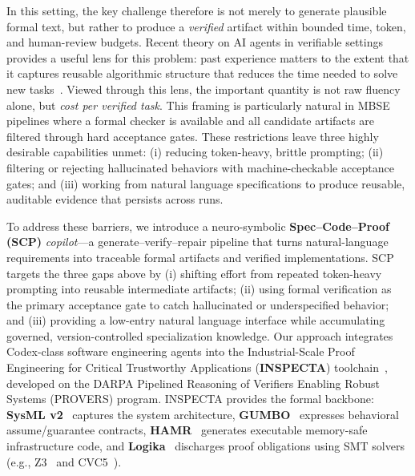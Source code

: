 \documentclass[conference]{IEEEtran}
\begin{document}
In this setting, the key challenge therefore is not merely to generate plausible formal text, but rather to produce a \emph{verified} artifact within bounded time, token, and human-review budgets. Recent theory on AI agents in verifiable settings provides a useful lens for this problem: past experience matters to the extent that it captures reusable algorithmic structure that reduces the time needed to solve new tasks~\cite{e28030332}. Viewed through this lens, the important quantity is not raw fluency alone, but \emph{cost per verified task}. This framing is particularly natural in MBSE pipelines where a formal checker is available and all candidate artifacts are filtered through hard acceptance gates.
%
These restrictions leave three highly desirable capabilities unmet:
(i) reducing token-heavy, brittle prompting; (ii) filtering or rejecting hallucinated behaviors with machine-checkable acceptance gates; and (iii) working from natural language specifications to produce reusable, auditable evidence that persists across runs.

To address these barriers, we introduce a neuro-symbolic \textbf{Spec--Code--Proof (SCP)} \emph{copilot}---a generate--verify--repair pipeline that turns natural-language requirements into traceable formal artifacts and verified implementations. SCP targets the three gaps above by (i) shifting effort from repeated token-heavy prompting into reusable intermediate artifacts; (ii) using formal verification as the primary acceptance gate to catch hallucinated or underspecified behavior; and (iii) providing a low-entry natural language interface while accumulating governed, version-controlled specialization knowledge. Our approach integrates Codex-class software engineering agents into the Industrial-Scale Proof Engineering for Critical Trustworthy Applications (\textbf{INSPECTA}) toolchain~\cite{hardin2025dasc}, developed on the DARPA Pipelined Reasoning of Verifiers Enabling Robust Systems (PROVERS) program. INSPECTA provides the formal backbone: \textbf{SysML v2}~\cite{sysmlv2_model_formalism_wg, sysmlv2_omg} captures the system architecture, \textbf{GUMBO}~\cite{gumbo, gumbo_galois} expresses behavioral assume/guarantee contracts, \textbf{HAMR}~\cite{hamr,HAMRsite} generates executable memory-safe infrastructure code, and \textbf{Logika}~\cite{HAMRsite} discharges proof obligations using SMT solvers (e.g., Z3~\cite{Z3} and CVC5~\cite{Barrett2011CVC4}). %
\end{document}
